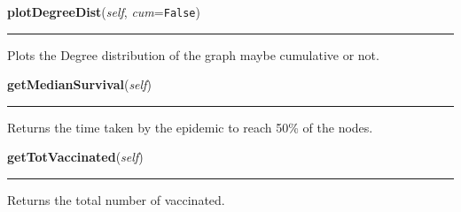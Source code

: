    \vspace{0.5ex}

    \begin{boxedminipage}{\textwidth}

    \raggedright \textbf{plotDegreeDist}(\textit{self}, \textit{cum}=\texttt{False})

    \vspace{-1.5ex}

    \rule{\textwidth}{0.5\fboxrule}
    Plots the Degree distribution of the graph maybe cumulative or not.

    \vspace{1ex}

    \end{boxedminipage}

    \label{Epigrass:simobj:graph:getMedianSurvival}

    \vspace{0.5ex}

    \begin{boxedminipage}{\textwidth}

    \raggedright \textbf{getMedianSurvival}(\textit{self})

    \vspace{-1.5ex}

    \rule{\textwidth}{0.5\fboxrule}
    Returns the time taken by the epidemic to reach 50\% of the nodes.

    \vspace{1ex}

    \end{boxedminipage}

    \label{Epigrass:simobj:graph:getTotVaccinated}

    \vspace{0.5ex}

    \begin{boxedminipage}{\textwidth}

    \raggedright \textbf{getTotVaccinated}(\textit{self})

    \vspace{-1.5ex}

    \rule{\textwidth}{0.5\fboxrule}
    Returns the total number of vaccinated.

    \vspace{1ex}

    \end{boxedminipage}

